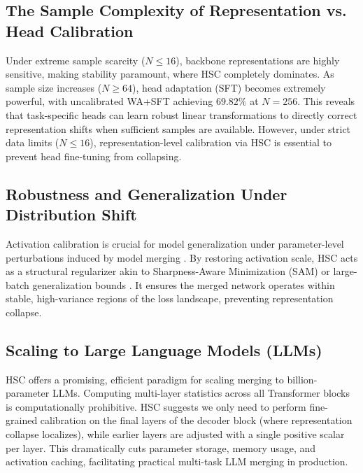\documentclass{article}
\begin{document}
\subsection{The Sample Complexity of Representation vs. Head Calibration}
Under extreme sample scarcity ($N \le 16$), backbone representations are highly sensitive, making stability paramount, where HSC completely dominates. As sample size increases ($N \ge 64$), head adaptation (SFT) becomes extremely powerful, with uncalibrated WA+SFT achieving $69.82\%$ at $N=256$. This reveals that task-specific heads can learn robust linear transformations to directly correct representation shifts when sufficient samples are available. However, under strict data limits ($N \le 16$), representation-level calibration via HSC is essential to prevent head fine-tuning from collapsing.

\subsection{Robustness and Generalization Under Distribution Shift}
Activation calibration is crucial for model generalization under parameter-level perturbations induced by model merging \cite{hendrycks2019benchmarking, szegedy2013intriguing}. By restoring activation scale, HSC acts as a structural regularizer akin to Sharpness-Aware Minimization (SAM) \cite{foret2020sharpness} or large-batch generalization bounds \cite{keskar2016large}. It ensures the merged network operates within stable, high-variance regions of the loss landscape, preventing representation collapse.

\subsection{Scaling to Large Language Models (LLMs)}
HSC offers a promising, efficient paradigm for scaling merging to billion-parameter LLMs. Computing multi-layer statistics across all Transformer blocks is computationally prohibitive. HSC suggests we only need to perform fine-grained calibration on the final layers of the decoder block (where representation collapse localizes), while earlier layers are adjusted with a single positive scalar per layer. This dramatically cuts parameter storage, memory usage, and activation caching, facilitating practical multi-task LLM merging in production.
\end{document}
